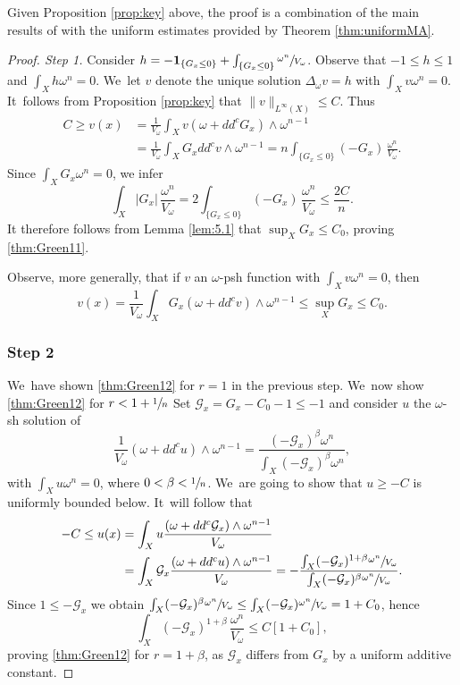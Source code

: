 \documentclass[11pt]{article}
\numberwithin{equation}{section}
\theoremstyle{definition}
\begin{document}
Given Proposition \ref{prop:key} above, the proof is a combination of
the main results of \cite{GPS22,GPSS22}
with the uniform estimates provided by Theorem \ref{thm:uniformMA}.

\begin{proof}[Proof. Step 1]
Consider $h=-{\bf 1}_{\{G_x \leq 0 \} }+\int_{\{G_x \leq 0 \}} \sfrac{\omega^n}{V_{\omega}}$.
Observe that $-1 \leq h \leq 1$ and $\int_X h \omega^n=0$. We~let $v$ denote the unique
solution $\Delta_{\omega} v=h$ with $\int_X v \omega^n=0$. It~follows from Proposition \ref{prop:key} that $\|v\|_{L^{\infty}(X)} \leq C$.
Thus
\begin{align*}
C \geq v(x) &= \frac{1}{V_{\omega}} \int_X v (\omega+dd^c G_x) \wedge \omega^{n-1} \\
&= \frac{1}{V_{\omega}} \int_X G_x dd^c v \wedge \omega^{n-1}
=n \int_{\{G_x \leq 0 \}} (-G_x) \,\frac{\omega^n}{V_{\omega}}.
\end{align*}
Since $\int_X G_x \omega^n=0$, we infer
\[
\int_X |G_x|\, \frac{\omega^n}{V_{\omega}} =
2 \int_{\{G_x \leq 0 \}} (-G_x)\, \frac{\omega^n}{V_{\omega}} \leq \frac{2C}{n}.
\]
It therefore follows from Lemma \ref{lem:5.1} that $\sup_X G_x \leq C_0$, proving \eqref{thm:Green11}.

Observe, more generally, that if $v$ an $\omega$-psh function with $\int_X v \omega^n=0$, then
\begin{equation} \label{eq:bddsup}
v(x) =\frac{1}{V_{\omega}} \int_X G_x (\omega+dd^c v) \wedge \omega^{n-1} \leq \sup_X G_x \leq C_0.
\end{equation}

\subsubsection*{Step 2}
We~have shown \eqref{thm:Green12} for $r=1$ in the previous step. We~now show \eqref{thm:Green12} for $r<1+\sfrac{1}{n}$
Set ${\mathcal G}_x=G_x-C_0-1 \leq -1$ and
consider $u$ the $\omega$-sh solution of
\[
\frac{1}{V_{\omega}} (\omega+dd^c u) \wedge \omega^{n-1} =
\frac{(-{\mathcal G}_x)^{\beta} \omega^n}{\int_X (-{\mathcal G}_x)^{\beta} \omega^n},
\]
with $\int_X u \omega^n=0$, where $0<\beta < \sfrac{1}{n}$. We~are going to show that
$u \geq -C$ is uniformly bounded below. It~will follow that
\begin{align*}
-C \leq u(x) &= \int_X u \frac{(\omega+dd^c {\mathcal G}_x) \wedge \omega^{n-1}}{V_{\omega}} \\
&= \int_X {\mathcal G}_x \frac{(\omega+dd^c u) \wedge \omega^{n-1}}{V_{\omega}}
= -\frac{\int_X (-{\mathcal G}_x)^{1+\beta} \sfrac{\omega^n}{V_{\omega}}}{\int_X (-{\mathcal G}_x)^{\beta} \sfrac{\omega^n}{V_{\omega}}}.
\end{align*}
Since $1 \leq -{\mathcal G}_x$ we obtain
$\int_X (-{\mathcal G}_x)^{\beta} \sfrac{\omega^n}{V_{\omega}} \leq \int_X (-{\mathcal G}_x) \sfrac{\omega^n}{V_{\omega}}=1+C_0$, hence
\[
\int_X (-{\mathcal G}_x)^{1+\beta}\, \frac{\omega^n}{V_{\omega}} \leq C[1+C_0],
\]
proving \eqref{thm:Green12} for $r=1+\beta$, as ${\mathcal G}_x$ differs from $G_x$ by a uniform additive constant.


\end{proof}
\end{document}
